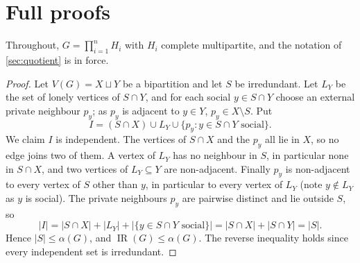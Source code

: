 \documentclass[11pt,a4paper]{article}
\theoremstyle{plain}
\theoremstyle{definition}
\theoremstyle{remark}
\newcommand{\IR}{\operatorname{IR}}
\begin{document}
\appendix

\section{Full proofs}\label{app:proofs}

Throughout, $G=\prod_{i=1}^nH_i$ with $H_i$ complete multipartite, and the notation of \cref{sec:quotient} is in force.

\label{pf:bip}
\lembip*
\begin{proof}
Let $V(G)=X\sqcup Y$ be a bipartition and let $S$ be irredundant. Let $L_Y$ be the set of lonely vertices of $S\cap Y$, and for each social $y\in S\cap Y$ choose an external private neighbour $p_y$; as $p_y$ is adjacent to $y\in Y$, $p_y\in X\setminus S$. Put
\[
I=(S\cap X)\cup L_Y\cup\{p_y:y\in S\cap Y\text{ social}\}.
\]
We claim $I$ is independent. The vertices of $S\cap X$ and the $p_y$ all lie in $X$, so no edge joins two of them. A vertex of $L_Y$ has no neighbour in $S$, in particular none in $S\cap X$, and two vertices of $L_Y\subseteq Y$ are non-adjacent. Finally $p_y$ is non-adjacent to every vertex of $S$ other than $y$, in particular to every vertex of $L_Y$ (note $y\notin L_Y$ as $y$ is social). The private neighbours $p_y$ are pairwise distinct and lie outside $S$, so
\[
|I|=|S\cap X|+|L_Y|+|\{y\in S\cap Y\text{ social}\}|=|S\cap X|+|S\cap Y|=|S|.
\]
Hence $|S|\le\alpha(G)$, and $\IR(G)\le\alpha(G)$. The reverse inequality holds since every independent set is irredundant.
\end{proof}
\end{document}
